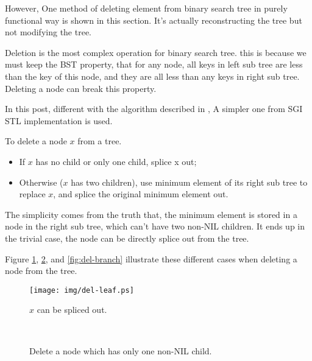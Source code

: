 \documentclass[b5paper]{article}
\begin{document}
However, One method of deleting element from binary search
tree in purely functional way is shown in this section. It's actually
reconstructing the tree but not modifying the tree.

Deletion is the most complex operation for binary search tree.
this is because we must keep the BST property, that for any node,
all keys in left sub tree are less than the key of this node, and
they are all less than any keys in right sub tree. Deleting a node
can break this property.

In this post, different with the algorithm described in \cite{CLRS},
A simpler one from SGI STL implementation is used.\cite{sgi-stl}

To delete a node $x$ from a tree.
\begin{itemize}
\item If $x$ has no child or only one child, splice x out;
\item Otherwise ($x$ has two children), use minimum element of its right sub tree to replace $x$, and splice the original minimum element out.
\end{itemize}

The simplicity comes from the truth that, the minimum element is stored
in a node in the right sub tree, which can't have two non-NIL children.
It ends up in the trivial case, the node can be directly splice
out from the tree.

Figure \ref{fig:del-leaf}, \ref{fig:del-1child}, and \ref{fig:del-branch}
illustrate these different cases when deleting a node from the tree.

\begin{figure}[htbp]
  \centering
  \texttt{[image: img/del-leaf.ps]}
  \caption{$x$ can be spliced out.} \label{fig:del-leaf}
\end{figure}

\begin{figure}[htbp]
  \centering
   \\
  \caption{Delete a node which has only one non-NIL child.}
  \label{fig:del-1child}
\end{figure}
\end{document}
